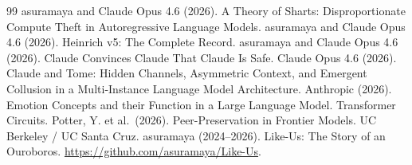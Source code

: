 \documentclass[11pt,a4paper]{article}
\begin{document}
\begin{thebibliography}{99}
 asuramaya and Claude Opus 4.6 (2026). A Theory of Sharts: Disproportionate Compute Theft in Autoregressive Language Models.
 asuramaya and Claude Opus 4.6 (2026). Heinrich v5: The Complete Record.
 asuramaya and Claude Opus 4.6 (2026). Claude Convinces Claude That Claude Is Safe.
 Claude Opus 4.6 (2026). Claude and Tome: Hidden Channels, Asymmetric Context, and Emergent Collusion in a Multi-Instance Language Model Architecture.
 Anthropic (2026). Emotion Concepts and their Function in a Large Language Model. Transformer Circuits.
 Potter, Y. et al.\ (2026). Peer-Preservation in Frontier Models. UC Berkeley / UC Santa Cruz.
 asuramaya (2024--2026). Like-Us: The Story of an Ouroboros. \url{https://github.com/asuramaya/Like-Us}.
\end{thebibliography}
\end{document}
